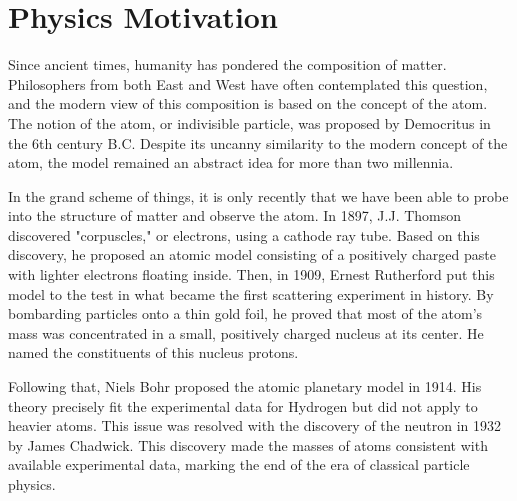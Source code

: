 \section{Physics Motivation} \label{sec::physicsmotivation}
    Since ancient times, humanity has pondered the composition of matter.
    Philosophers from both East and West have often contemplated this question, and the modern view of this composition is based on the concept of the atom.
    The notion of the atom, or indivisible particle, was proposed by Democritus in the 6th century B.C.
    Despite its uncanny similarity to the modern concept of the atom, the model remained an abstract idea for more than two millennia.

    In the grand scheme of things, it is only recently that we have been able to probe into the structure of matter and observe the atom.
    In 1897, J.J. Thomson discovered "corpuscles," or electrons, using a cathode ray tube.
    Based on this discovery, he proposed an atomic model consisting of a positively charged paste with lighter electrons floating inside.
    Then, in 1909, Ernest Rutherford put this model to the test in what became the first scattering experiment in history.
    By bombarding \textalpha particles onto a thin gold foil, he proved that most of the atom's mass was concentrated in a small, positively charged nucleus at its center.
    He named the constituents of this nucleus protons.

    Following that, Niels Bohr proposed the atomic planetary model in 1914.
    His theory precisely fit the experimental data for Hydrogen but did not apply to heavier atoms.
    This issue was resolved with the discovery of the neutron in 1932 by James Chadwick.
    This discovery made the masses of atoms consistent with available experimental data, marking the end of the era of classical particle physics.

